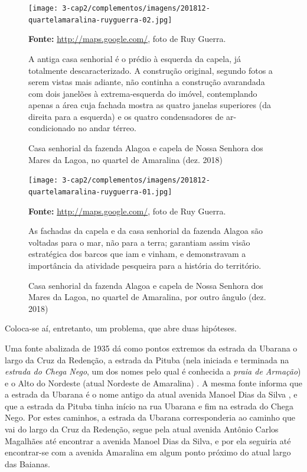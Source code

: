 \begin{figure}
\caption{Casa senhorial da fazenda Alagoa e capela de Nossa Senhora dos Mares da Lagoa, no quartel de Amaralina (dez. 2018)}
\centering
\texttt{[image: 3-cap2/complementos/imagens/201812-quartelamaralina-ruyguerra-02.jpg]}{\footnotesize \par \textbf{Fonte:} \url{http://maps.google.com/}, foto de Ruy Guerra. \par A antiga casa senhorial é o prédio à esquerda da capela, já totalmente descaracterizado. A construção original, segundo fotos a serem vistas mais adiante, não continha a construção avarandada com dois janelões à extrema-esquerda do imóvel, contemplando apenas a área cuja fachada mostra as quatro janelas superiores (da direita para a esquerda) e os quatro condensadores de ar-condicionado no andar térreo.} 
\label{fig:2018-quartelamaralina02}
\end{figure}

\begin{figure}
\caption{Casa senhorial da fazenda Alagoa e capela de Nossa Senhora dos Mares da Lagoa, no quartel de Amaralina, por outro ângulo (dez. 2018)}
\centering
\texttt{[image: 3-cap2/complementos/imagens/201812-quartelamaralina-ruyguerra-01.jpg]}{\footnotesize \par \textbf{Fonte:} \url{http://maps.google.com/}, foto de Ruy Guerra. \par As fachadas da capela e da casa senhorial da fazenda Alagoa são voltadas para o mar, não para a terra; garantiam assim visão estratégica dos barcos que iam e vinham, e demonstravam a importância da atividade pesqueira para a história do território.} 
\label{fig:2018-quartelamaralina01}
\end{figure}

Coloca-se aí, entretanto, um problema, que abre duas hipóteses.

Uma fonte abalizada de 1935 dá como pontos extremos da estrada da Ubarana o largo da Cruz da Redenção, a estrada da Pituba (nela iniciada e terminada na \textit{estrada do Chega Nego}, um dos nomes pelo qual é conhecida a \textit{praia de Armação}) e o Alto do Nordeste (atual Nordeste de Amaralina) \cite[pp.~41, 42, 97]{souza_guia_1935}. A mesma fonte informa que a estrada da Ubarana é o nome antigo da atual avenida Manoel Dias da Silva \cite[p.~85]{souza_guia_1935}, e que a estrada da Pituba tinha início na rua Ubarana e fim na estrada do Chega Nego. Por estes caminhos, a estrada da Ubarana corresponderia ao caminho que vai do largo da Cruz da Redenção, segue pela atual avenida Antônio Carlos Magalhães até encontrar a avenida Manoel Dias da Silva, e por ela seguiria até encontrar-se com a avenida Amaralina em algum ponto próximo do atual largo das Baianas.

